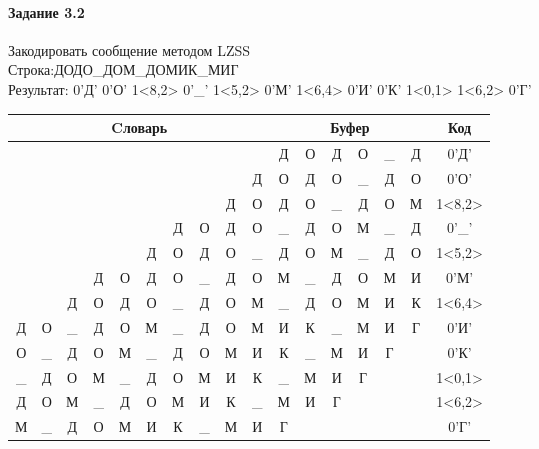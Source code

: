 \documentclass[a4paper, 12pt]{article}
\begin{document}
\paragraph{Задание 3.2}

Закодировать сообщение методом LZSS\\
Строка:ДОДО\_ДОМ\_ДОМИК\_МИГ\\
Результат: 0'Д' 0'О' 1<8,2> 0'\_' 1<5,2> 0'М' 1<6,4> 0'И' 0'К' 1<0,1> 1<6,2> 0'Г'\\
\begin{table}[h!]
\centering
\begin{tabular}{|c|c|c|c|c|c|c|c|c|c|c|c|c|c|c|c|c|}
\hline
\multicolumn{10}{|c|}{Cловарь} & \multicolumn{6}{c|}{Буфер} & Код  \\ \hline
  &   &   &   &   &   &   &   &   &   & Д & О & Д & О & \_ & Д & 0'Д'\\ \hline
  &   &   &   &   &   &   &   &   & Д & О & Д & О & \_ & Д & О & 0'О'\\ \hline
  &   &   &   &   &   &   &   & \cellcolor[HTML]{FFFF00} Д & \cellcolor[HTML]{FFFF00} О & \cellcolor[HTML]{FFFF00} Д & \cellcolor[HTML]{FFFF00} О & \_ & Д & О & М & 1<8,2>\\ \hline
  &   &   &   &   &   & Д & О & Д & О & \_ & Д & О & М & \_ & Д & 0'\_'\\ \hline
  &   &   &   &   & \cellcolor[HTML]{FFFF00} Д & \cellcolor[HTML]{FFFF00} О & Д & О & \_ & \cellcolor[HTML]{FFFF00} Д & \cellcolor[HTML]{FFFF00} О & М & \_ & Д & О & 1<5,2>\\ \hline
  &   &   & Д & О & Д & О & \_ & Д & О & М & \_ & Д & О & М & И & 0'М'\\ \hline
  &   & Д & О & Д & О & \cellcolor[HTML]{FFFF00} \_ & \cellcolor[HTML]{FFFF00} Д & \cellcolor[HTML]{FFFF00} О & \cellcolor[HTML]{FFFF00} М & \cellcolor[HTML]{FFFF00} \_ & \cellcolor[HTML]{FFFF00} Д & \cellcolor[HTML]{FFFF00} О & \cellcolor[HTML]{FFFF00} М & И & К & 1<6,4>\\ \hline
Д & О & \_ & Д & О & М & \_ & Д & О & М & И & К & \_ & М & И & Г & 0'И'\\ \hline
О & \_ & Д & О & М & \_ & Д & О & М & И & К & \_ & М & И & Г &   & 0'К'\\ \hline
\cellcolor[HTML]{FFFF00} \_ & Д & О & М & \_ & Д & О & М & И & К & \cellcolor[HTML]{FFFF00} \_ & М & И & Г &   &   & 1<0,1>\\ \hline
Д & О & М & \_ & Д & О & \cellcolor[HTML]{FFFF00} М & \cellcolor[HTML]{FFFF00} И & К & \_ & \cellcolor[HTML]{FFFF00} М & \cellcolor[HTML]{FFFF00} И & Г &   &   &   & 1<6,2>\\ \hline
М & \_ & Д & О & М & И & К & \_ & М & И & Г &   &   &   &   &   & 0'Г'\\ \hline
\end{tabular}
\end{table}
\end{document}
